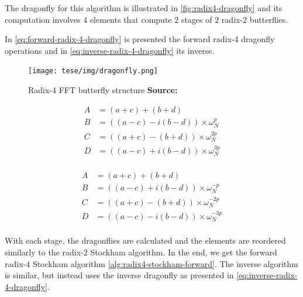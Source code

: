 \documentclass[
  oneside,
  11pt, a4paper,
  footinclude=true,
  headinclude=true,
  cleardoublepage=empty
]{scrbook}
\newcommand*{\source}[1]{%
    \textbf{Source:} \cite{#1}%
}
\begin{document}
The dragonfly for this algorithm is illustrated in \autoref{fig:radix4-dragonfly} and its computation involves 4 elements that compute $2$ stages of $2$ radix-2 butterflies.

In \autoref{eq:forward-radix-4-dragonfly} is presented the forward radix-4 dragonfly operations and in \autoref{eq:inverse-radix-4-dragonfly} its inverse.

\begin{figure}[H]
    \centering
    \texttt{[image: tese/img/dragonfly.png]}
    \caption{Radix-4 FFT butterfly structure \source{marti2009radix}}
    \label{fig:radix4-dragonfly}
\end{figure}

\begin{equation} \label{eq:forward-radix-4-dragonfly}
    \begin{split}
        A &= (a+c) + (b+d) \\
        B &= ((a-c) - i(b-d)) \times \omega_{N}^{p} \\
        C &= ((a+c) -  (b+d)) \times \omega_{N}^{2p} \\
        D &= ((a-c) + i(b-d)) \times \omega_{N}^{3p} \\
    \end{split}
\end{equation}

\begin{equation} \label{eq:inverse-radix-4-dragonfly}
    \begin{split}
        A &= (a+c) + (b+d) \\
        B &= ((a-c) + i(b-d)) \times \omega_{N}^{-p} \\
        C &= ((a+c) -  (b+d)) \times \omega_{N}^{-2p} \\
        D &= ((a-c) - i(b-d)) \times \omega_{N}^{-3p} \\
    \end{split}
\end{equation}

With each stage, the dragonflies are calculated and the elements are reordered similarly to the radix-2 Stockham algorithm. In the end, we get the forward radix-4 Stockham algorithm \autoref{alg:radix4-stockham-forward}. The inverse algorithm is similar, but instead uses the inverse dragonfly as presented in \autoref{eq:inverse-radix-4-dragonfly}.
\end{document}
